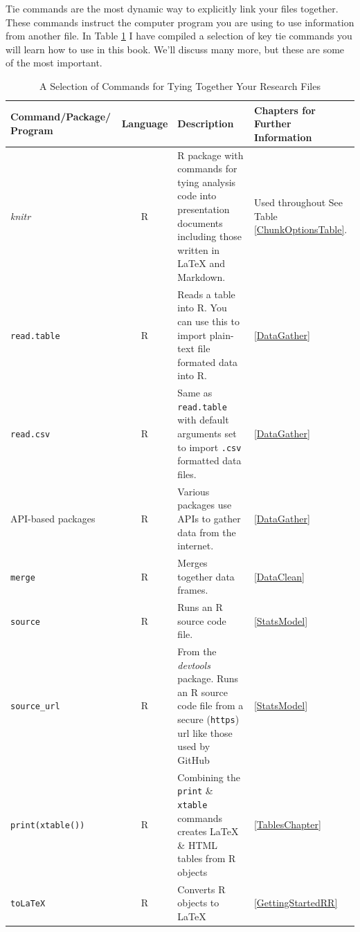 \documentclass[krantz1]{krantz}
\begin{document}
Tie commands are the most dynamic way to explicitly link your files together. These commands instruct the computer program you are using to use information from another file. In Table \ref{TableTieCommands} I have compiled a selection of key tie commands you will learn how to use in this book. We'll discuss many more, but these are some of the most important.

\begin{table}
    \caption{A Selection of Commands for Tying Together Your Research Files}
    \label{TableTieCommands}
    \vspace{0.3cm}
    {\footnotesize{
    \begin{tabular}{p{2.5cm} c p{5.25cm} p{2cm}}
        \hline \vspace{0.15cm}
        Command/Package/ Program & Language & Description & Chapters for Further Information \\[0.3cm]  
        \hline \hline
        {\emph{knitr}} & R & R package with commands for tying analysis code into presentation documents including those written in LaTeX and Markdown. & Used throughout See Table \ref{ChunkOptionsTable}. \\[0.25cm]
        {\tt{read.table}} & R & Reads a table into R. You can use this to import plain-text file formated data into R. & \hfill\ref{DataGather} \\[0.25cm]
        {\tt{read.csv}} & R & Same as \texttt{read.table} with default arguments set to import \texttt{.csv} formatted data files. & \hfill\ref{DataGather} \\[0.25cm]  
        API-based packages & R & Various packages use APIs to gather data from the internet. & \hfill\ref{DataGather} \\[0.25cm]
        {\tt{merge}} & R & Merges together data frames. & \hfill\ref{DataClean} \\[0.25cm]
        {\tt{source}} & R & Runs an R source code file. & \hfill\ref{StatsModel} \\[0.25cm]
        {\tt{source\_url}} & R & From the {\emph{devtools}} package. Runs an R source code file from a secure ({\tt{https}}) url like those used by GitHub & \hfill\ref{StatsModel} \\[0.25cm]
        {\tt{print(xtable())}} & R & Combining the \texttt{print} \& \texttt{xtable} commands creates LaTeX \& HTML tables from R objects & \hfill\ref{TablesChapter} \\[0.25cm]
        {\tt{toLaTeX}} & R & Converts R objects to LaTeX & \hfill\ref{GettingStartedRR} \\[0.25cm]

\end{tabular}}}
\end{table}
\end{document}
